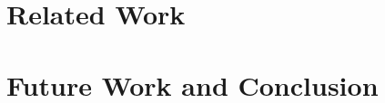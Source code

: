 \documentclass{iosart2c}
\begin{document}
\section{Related Work} \label{sec:relatedwork}

\section{Future Work and Conclusion} \label{sec:futureworkandconclusion}



\end{document}
